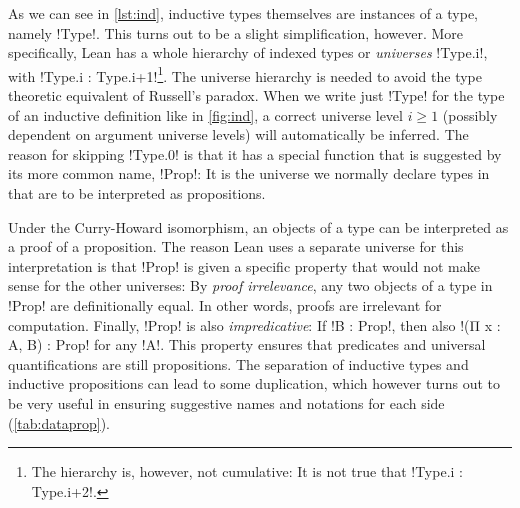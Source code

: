 As we can see in \autoref{lst:ind}, inductive types themselves are instances of
a type, namely \lean!Type!. This turns out to be a slight simplification,
however. More specifically, Lean has a whole hierarchy of indexed types
or \emph{universes} \lean!Type.{i}!, with \lean!Type.{i} :
Type.{i+1}!\footnote{The hierarchy is, however, not cumulative: It is not true
  that \lean!Type.{i} : Type.{i+2}!.}. The universe hierarchy is needed to avoid
the type theoretic equivalent of Russell's paradox. When we write just
\lean!Type! for the type of an inductive definition like in \autoref{fig:ind},
a correct universe level $i \ge 1$
(possibly dependent on argument universe levels) will automatically be inferred.
The reason for skipping \lean!Type.{0}! is that it has a special function that
is suggested by its more common name, \lean!Prop!: It is the universe we normally
declare types in that are to be interpreted as propositions.

Under the Curry-Howard isomorphism, an objects of a type can be interpreted as
a proof of a proposition. The reason Lean uses a separate universe for this
interpretation is that \lean!Prop! is given a specific property that would not
make sense for the other universes: By \emph{proof irrelevance}, any two
objects of a type in \lean!Prop! are definitionally equal. In other words,
proofs are irrelevant for computation. Finally, \lean!Prop! is also
\emph{impredicative}: If \lean!B : Prop!, then also \lean!(Π x : A, B) : Prop!
for any \lean!A!. This property ensures that predicates and universal
quantifications are still propositions.
The separation of inductive types and inductive propositions can lead to some duplication, which
however turns out to be very useful in ensuring suggestive names and notations
for each side (\autoref{tab:dataprop}).

